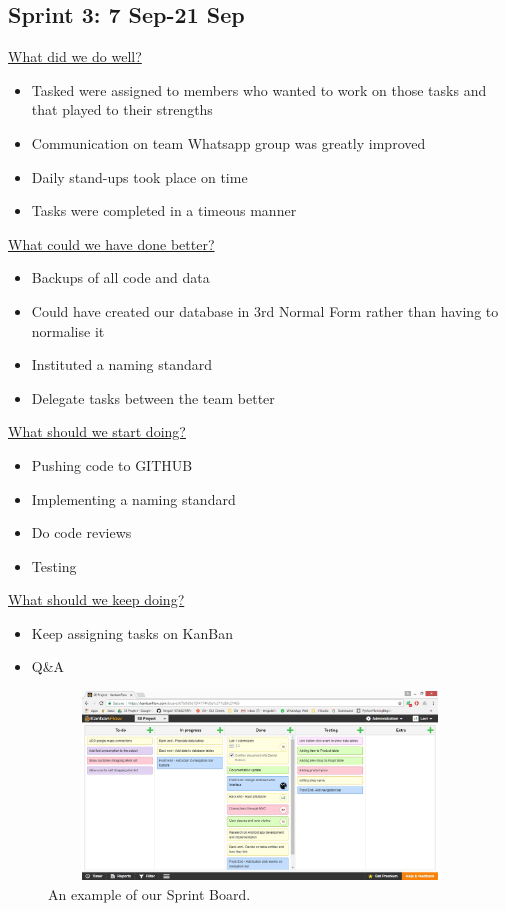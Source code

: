 \documentclass[12pt]{article}
\begin{document}
\subsection{Sprint 3: 7 Sep-21 Sep}
\underline{What did we do well?}
\begin{itemize}
\item Tasked were assigned to members who wanted to work on those tasks and that played to their strengths
\item Communication on team Whatsapp group was greatly improved 
\item Daily stand-ups took place on time
\item Tasks were completed in a timeous manner
\end{itemize}
\underline{What could we have done better?}
\begin{itemize}
\item Backups of all code and data
\item Could have created our database in 3rd Normal Form rather than having to normalise it
\item Instituted a naming standard
\item Delegate tasks between the team better
\end{itemize}
\underline{What should we start doing?}
\begin{itemize}
\item Pushing code to GITHUB 
\item Implementing a naming standard
\item Do code reviews
\item Testing
\end{itemize}
\underline{What should we keep doing?}
\begin{itemize}
\item Keep assigning tasks on KanBan
\item Q\&A
\end{itemize}

\begin{figure}[H]
  \includegraphics[width=15cm,height=5cm]{SprintBoard.jpg}
  \centering
  \caption{An example of our Sprint Board.}
\end{figure}
\end{document}
